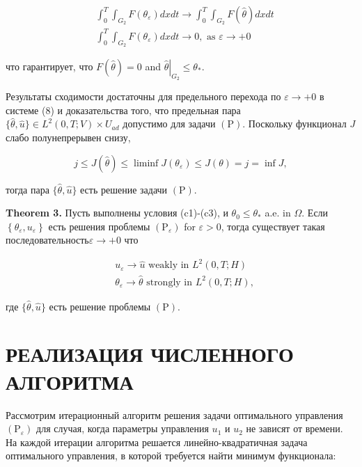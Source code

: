 \documentclass[10pt]{article}
\begin{document}
\[
\begin{aligned}
&\int_{0}^{T} \int_{G_{2}} F\left(\theta_{\varepsilon}\right) d x d t
 \rightarrow \int_{0}^{T} \int_{G_{2}} F(\widehat{\theta}) d x d t \\
&\int_{0}^{T} \int_{G_{2}} F\left(\theta_{\varepsilon}\right) d x d t
\rightarrow 0, \text { as } \varepsilon \rightarrow+0
\end{aligned}
\]

что гарантирует, что $F(\widehat{\theta})=0$ and $\left.\widehat{\theta}\right|_{G_{2}} \leq \theta_{*}$.

Результаты сходимости достаточны для предельного перехода по $\varepsilon \rightarrow+0$ в системе (8)
и доказательства того, что предельная пара
$\{\widehat{\theta}, \widehat{u}\} \in L ^{2}(0, T ; V) \times U_{a d}$
допустимо для задачи $(\mathrm{P})$.
Поскольку функционал $J$ слабо полунепрерывен снизу,

\[
j \leq J(\widehat{\theta}) \leq \liminf J\left(\theta_{\varepsilon}\right) \leq J(\theta)=j=\inf J,
\]

тогда пара $\{\widehat{\theta}, \widehat{u}\}$ есть решение задачи $(\mathrm{P})$.

\textbf{Theorem 3.}
Пусть выполнены условия (c1)-(c3), и $\theta_{0} \leq \theta_{*}$ a.e. in $\Omega$.
Если $\left\{\theta_{\varepsilon}, u_{\varepsilon}\right\}$ есть решения проблемы
$\left(\mathrm{P}_{\varepsilon}\right)$ for $\varepsilon>0$, тогда существует
такая последовательность$\varepsilon \rightarrow+0$ что


\[
\begin{aligned}
&u_{\varepsilon} \rightarrow \widehat{u} \text { weakly in } L^{2}(0, T ; H) \\
&\theta_{\varepsilon} \rightarrow \widehat{\theta} \text { strongly in } L^{2}(0, T ; H),
\end{aligned}
\]


где $\{\widehat{\theta}, \widehat{u}\}$ есть решение проблемы $(\mathrm{P})$.

\section{РЕАЛИЗАЦИЯ ЧИСЛЕННОГО АЛГОРИТМА}

Рассмотрим итерационный алгоритм решения задачи оптимального управления
$\left(\mathrm{P}_{\varepsilon}\right)$ для случая, когда параметры управления
$u_{1}$ и $u_{2}$ не зависят от времени.
На каждой итерации алгоритма
решается линейно-квадратичная задача оптимального управления, в которой требуется найти минимум функционала:
\end{document}
